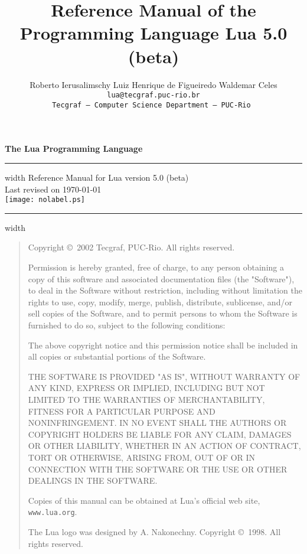 \documentclass[11pt,twoside]{article}
\def\tecgraf{{\sf Tecgraf}}
\newcommand{\Version}{5.0 (beta)}
\begin{document}
\thispagestyle{empty}
\pagestyle{empty}

{
\parindent=0pt
{\LARGE\bf
The Lua Programming Language}
\hfill
\vskip4pt \hrule height 4pt width \hsize \vskip4pt
\hfill
Reference Manual for Lua version \Version
\\
\null
\hfill
Last revised on \today
\\
\vfill
\centering
\texttt{[image: nolabel.ps]}
\vfill
\vskip4pt \hrule height 2pt width \hsize
}

\newpage
\begin{quotation}
\parskip=10pt
\parindent=0pt
\footnotesize
\null\vfill

\noindent
Copyright \copyright\ 2002 Tecgraf, PUC-Rio.  All rights reserved.

Permission is hereby granted, free of charge,
to any person obtaining a copy of this software
and associated documentation files (the "Software"),
to deal in the Software without restriction,
including without limitation the rights to use, copy, modify,
merge, publish, distribute, sublicense,
and/or sell copies of the Software,
and to permit persons to whom the Software is furnished to do so,
subject to the following conditions:

The above copyright notice and this permission notice shall be
included in all copies or substantial portions of the Software.

THE SOFTWARE IS PROVIDED "AS IS", WITHOUT WARRANTY OF ANY KIND,
EXPRESS OR IMPLIED,
INCLUDING BUT NOT LIMITED TO THE WARRANTIES OF MERCHANTABILITY,
FITNESS FOR A PARTICULAR PURPOSE AND NONINFRINGEMENT.
IN NO EVENT SHALL THE AUTHORS OR COPYRIGHT HOLDERS BE LIABLE
FOR ANY CLAIM, DAMAGES OR OTHER LIABILITY,
WHETHER IN AN ACTION OF CONTRACT, TORT OR OTHERWISE,
ARISING FROM, OUT OF OR IN CONNECTION WITH THE SOFTWARE
OR THE USE OR OTHER DEALINGS IN THE SOFTWARE.


Copies of this manual can be obtained at
Lua's official web site,
\verb|www.lua.org|.

\bigskip
The Lua logo was designed by A. Nakonechny.
Copyright \copyright\ 1998.  All rights reserved.
\end{quotation}
\newpage

\title{\Large\bf Reference Manual of the Programming Language Lua \Version}

\author{%
Roberto Ierusalimschy\qquad
Luiz Henrique de Figueiredo\qquad
Waldemar Celes
\vspace{1.0ex}\\
\smallskip
\small\tt lua@tecgraf.puc-rio.br
\vspace{2.0ex}\\
\tecgraf\ --- Computer Science Department --- PUC-Rio
}
\end{document}
